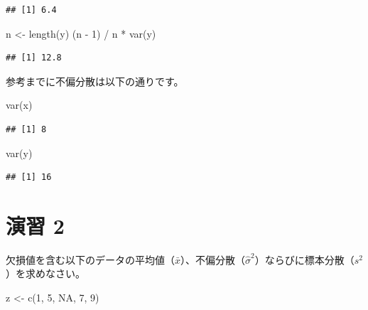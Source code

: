 \documentclass[
  12pt,
]{book}
\newenvironment{Shaded}{\begin{snugshade}}{\end{snugshade}}
\newcommand{\ConstantTok}[1]{\textcolor[rgb]{0.00,0.00,0.00}{#1}}
\newcommand{\DecValTok}[1]{\textcolor[rgb]{0.00,0.00,0.81}{#1}}
\newcommand{\FunctionTok}[1]{\textcolor[rgb]{0.00,0.00,0.00}{#1}}
\newcommand{\NormalTok}[1]{#1}
\newcommand{\OtherTok}[1]{\textcolor[rgb]{0.56,0.35,0.01}{#1}}
\newcommand{\SpecialCharTok}[1]{\textcolor[rgb]{0.00,0.00,0.00}{#1}}
\begin{document}
\begin{verbatim}
## [1] 6.4
\end{verbatim}

\begin{Shaded}
\begin{Highlighting}[numbers=left,,]
\NormalTok{n }\OtherTok{\textless{}{-}} \FunctionTok{length}\NormalTok{(y)}
\NormalTok{(n }\SpecialCharTok{{-}} \DecValTok{1}\NormalTok{) }\SpecialCharTok{/}\NormalTok{ n }\SpecialCharTok{*} \FunctionTok{var}\NormalTok{(y)}
\end{Highlighting}
\end{Shaded}

\begin{verbatim}
## [1] 12.8
\end{verbatim}

参考までに不偏分散は以下の通りです。

\begin{Shaded}
\begin{Highlighting}[numbers=left,,]
\FunctionTok{var}\NormalTok{(x)}
\end{Highlighting}
\end{Shaded}

\begin{verbatim}
## [1] 8
\end{verbatim}

\begin{Shaded}
\begin{Highlighting}[numbers=left,,]
\FunctionTok{var}\NormalTok{(y)}
\end{Highlighting}
\end{Shaded}

\begin{verbatim}
## [1] 16
\end{verbatim}

\hypertarget{ux6f14ux7fd2-2-1}{%
\section*{演習 2}\label{ux6f14ux7fd2-2-1}}

欠損値を含む以下のデータの平均値（\(\bar{x}\)）、不偏分散（\(\hat{\sigma}^2\)）ならびに標本分散（\(s^2\)）を求めなさい。

\begin{Shaded}
\begin{Highlighting}[numbers=left,,]
\NormalTok{z }\OtherTok{\textless{}{-}} \FunctionTok{c}\NormalTok{(}\DecValTok{1}\NormalTok{, }\DecValTok{5}\NormalTok{, }\ConstantTok{NA}\NormalTok{, }\DecValTok{7}\NormalTok{, }\DecValTok{9}\NormalTok{)}
\end{Highlighting}
\end{Shaded}
\end{document}

